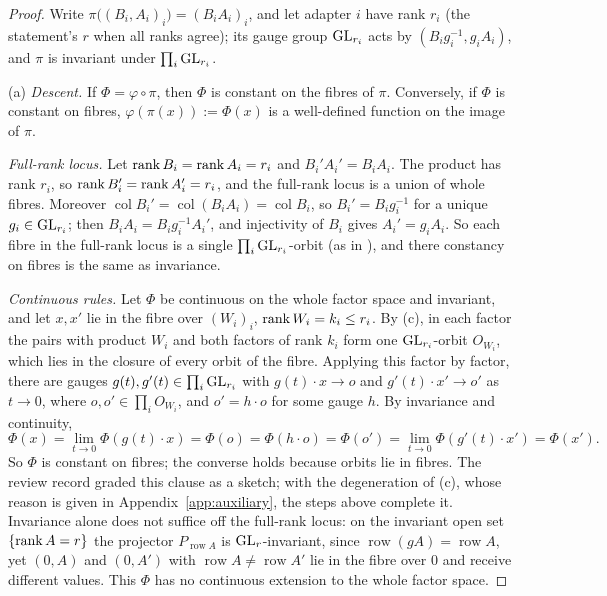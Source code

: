 \begin{proof}
Write $\pi\big((B_i,A_i)_i\big)=(B_iA_i)_i$, and let adapter $i$ have rank $r_i$ (the statement's $r$ when all ranks agree);
its gauge group $\mathrm{GL}_{r_i}$ acts by $(B_ig_i^{-1},g_iA_i)$, and $\pi$ is invariant under $\prod_i\mathrm{GL}_{r_i}$.

(a) \emph{Descent.} If $\Phi=\varphi\circ\pi$, then $\Phi$ is constant on the fibres of $\pi$. Conversely, if $\Phi$ is constant
on fibres, $\varphi(\pi(x)):=\Phi(x)$ is a well-defined function on the image of $\pi$.

\emph{Full-rank locus.} Let $\operatorname{rank} B_i=\operatorname{rank} A_i=r_i$ and $B_i'A_i'=B_iA_i$. The product has rank $r_i$, so $\operatorname{rank} B_i'=\operatorname{rank} A_i'=r_i$,
and the full-rank locus is a union of whole fibres. Moreover $\operatorname{col}B_i'=\operatorname{col}(B_iA_i)=
\operatorname{col}B_i$, so $B_i'=B_ig_i^{-1}$ for a unique $g_i\in\mathrm{GL}_{r_i}$; then $B_iA_i=B_ig_i^{-1}A_i'$, and injectivity of
$B_i$ gives $A_i'=g_iA_i$. So each fibre in the full-rank locus is a single $\prod_i\mathrm{GL}_{r_i}$-orbit (as in
), and there constancy on fibres is the same as invariance.

\emph{Continuous rules.} Let $\Phi$ be continuous on the whole factor space and invariant, and let $x,x'$ lie in the fibre
over $(W_i)_i$, $\operatorname{rank} W_i=k_i\le r_i$. By (c), in each factor the pairs with product $W_i$ and both factors of rank
$k_i$ form one $\mathrm{GL}_{r_i}$-orbit $O_{W_i}$, which lies in the closure of every orbit of the fibre. Applying this factor by
factor, there are gauges $g(t),g'(t)\in\prod_i\mathrm{GL}_{r_i}$ with $g(t)\cdot x\to o$ and $g'(t)\cdot x'\to o'$ as $t\to0$,
where $o,o'\in\prod_iO_{W_i}$, and $o'=h\cdot o$ for some gauge $h$. By invariance and continuity,
\[\Phi(x)=\lim_{t\to0}\Phi(g(t)\cdot x)=\Phi(o)=\Phi(h\cdot o)=\Phi(o')=\lim_{t\to0}\Phi(g'(t)\cdot x')=\Phi(x').\]
So $\Phi$ is constant on fibres; the converse holds because orbits lie in fibres. The review record graded this clause as a
sketch; with the degeneration of (c), whose reason is given in Appendix~\ref{app:auxiliary}, the steps above
complete it. Invariance alone does not suffice off the full-rank locus: on the invariant open set $\{\operatorname{rank} A=r\}$ the
projector $P_{\operatorname{row}A}$ is $\mathrm{GL}_r$-invariant, since $\operatorname{row}(gA)=\operatorname{row}A$, yet $(0,A)$
and $(0,A')$ with $\operatorname{row}A\ne\operatorname{row}A'$ lie in the fibre over $0$ and receive different values. This
$\Phi$ has no continuous extension to the whole factor space.


\end{proof}
